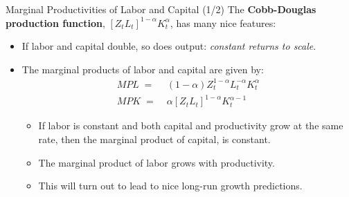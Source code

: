 \documentclass[10pt,c,aspectratio=1610,handout]{beamer}
\begin{document}
\begin{frame}{Marginal Productivities of Labor and Capital (1/2)}%
  The \textbf{Cobb-Douglas production function}, $\left[ Z_{t}L_{t}\right]^{1-\alpha}K_{t}^{\alpha}$, has many nice features:%
  \vspace*{0.15in}%
  \begin{itemize}%
    \item[$\blacktriangleright$] If labor and capital double, so does output: \emph{constant returns to scale}.%
    \pause%
    \item[$\blacktriangleright$] The marginal products of labor and capital are given by:%
    \begin{align*}
      MPL \; = & \; (1-\alpha )Z_{t}^{1-\alpha }L_{t}^{-\alpha }K_{t}^{\alpha }\\%
      MPK \; = & \; \alpha \left[ Z_{t}L_{t}\right] ^{1-\alpha }K_{t}^{\alpha -1}%
    \end{align*}%
    \vspace*{-0.25in}%
    \pause%
    \begin{itemize}%
      \item[$\rightarrow$] If labor is constant and both capital and productivity grow at the same rate, then the marginal product of capital, is constant.%
      \item[$\rightarrow$] The marginal product of labor grows with productivity.%
      \item[$\rightarrow$] This will turn out to lead to nice long-run growth predictions.%
    \end{itemize}%
  \end{itemize}%
\end{frame}%
\end{document}
